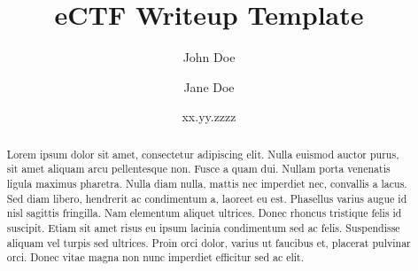 \documentclass{prace}
\title{eCTF Writeup Template}
\date{xx.yy.zzzz}
\author[1]{John Doe}
\author[1]{Jane Doe}
\affiliation{San Francisco State University, 1600 Holloway Avenue, San Francisco, CA 94132, USA}
\begin{document}
\maketitle

\begin{abstract}
Lorem ipsum dolor sit amet, consectetur adipiscing elit. Nulla euismod auctor purus,
sit amet aliquam arcu pellentesque non. Fusce a quam dui. Nullam porta venenatis ligula
maximus pharetra. Nulla diam nulla, mattis nec imperdiet nec, convallis a lacus. Sed 
diam libero, hendrerit ac condimentum a, laoreet eu est. Phasellus varius augue id nisl
sagittis fringilla. Nam elementum aliquet ultrices. Donec rhoncus tristique felis id
suscipit. Etiam sit amet risus eu ipsum lacinia condimentum sed ac felis. Suspendisse
aliquam vel turpis sed ultrices. Proin orci dolor, varius ut faucibus et, placerat
pulvinar orci. Donec vitae magna non nunc imperdiet efficitur sed ac elit.
\end{abstract}
\end{document}
